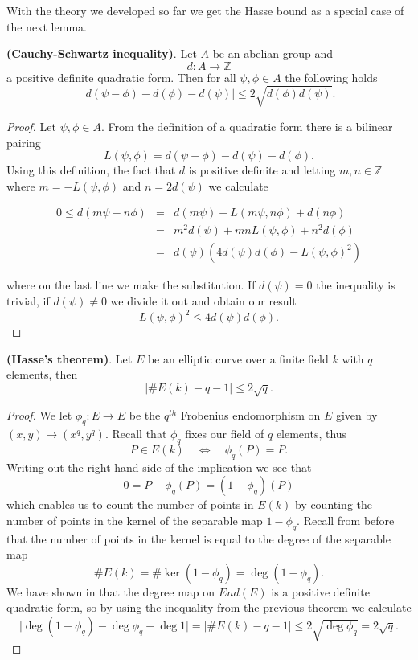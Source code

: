 With the theory we developed so far we get the Hasse bound as a special case of the next lemma.

\begin{lemma}
 \textbf{(Cauchy-Schwartz inequality)}. Let $A$ be an abelian group and
$$ d: A \rightarrow \mathbb{Z} $$
a positive definite quadratic form. Then for all $\psi, \phi \in A$ the following holds
$$ \lvert d(\psi-\phi)-d(\phi)-d(\psi) \rvert \leq 2 \sqrt{d(\phi)d(\psi)}. $$
\end{lemma}
\begin{proof}
 Let $\psi, \phi \in A$. From the definition of a quadratic form there is a bilinear pairing
$$ L(\psi, \phi) = d(\psi-\phi) - d(\psi) - d(\phi). $$
Using this definition, the fact that $d$ is positive definite and letting $m,n \in \mathbb{Z}$ where
$m = -L(\psi, \phi)$ and $n = 2d(\psi)$ we calculate

\begin{eqnarray}
 0 \leq d(m\psi - n\phi) &=& d(m\psi) + L(m\psi, n\phi) + d(n\phi) \nonumber \\
			 &=& m^2 d(\psi) + mnL(\psi,\phi) + n^2 d(\phi) \nonumber \\
			 &=& d(\psi) \left( 4d(\psi)d(\phi)-L(\psi, \phi)^2 \right) \nonumber 
\end{eqnarray}

where on the last line we make the substitution. If $d(\psi)=0$ the inequality is trivial, if
$d(\psi) \neq 0$ we divide it out and obtain our result
$$L(\psi, \phi)^2 \leq 4d(\psi)d(\phi). $$
\end{proof}


\begin{thm}
 \textbf{(Hasse's theorem)}. Let $E$ be an elliptic curve over a finite field $k$ with $q$ elements, then
$$ \lvert \#E(k) - q - 1 \rvert \leq 2\sqrt{q}. $$
\end{thm}
\begin{proof}
 We let $\phi_q: E \rightarrow E$ be the $q^{th}$ Frobenius endomorphism on $E$ given by 
$(x,y) \mapsto (x^q, y^q)$. Recall that $\phi_q$ fixes our field of $q$ elements, thus
$$ P \in E(k) \quad \iff \quad \phi_q(P) = P.$$
Writing out the right hand side of the implication we see that
$$ 0 = P - \phi_q(P) = (1 - \phi_q)(P) $$
which enables us to count the number of points in $E(k)$ by counting the number of points in the kernel
of the separable map $1-\phi_q$. Recall from before that the number of points in the kernel is equal
to the degree of the separable map
$$ \#E(k) = \# \ker(1-\phi_q) = \deg(1-\phi_q). $$
We have shown in that the degree map on $End(E)$ is a positive definite quadratic form, so
by using the inequality from the previous theorem we calculate
$$\lvert \deg(1-\phi_q) - \deg \phi_q - \deg 1\rvert = \lvert \#E(k) - q - 1\rvert \leq 2\sqrt{\deg \phi_q} = 2\sqrt{q}.$$
\end{proof}

